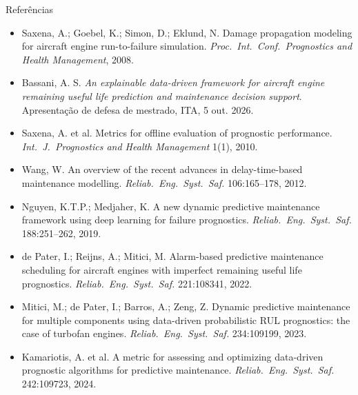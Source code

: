 \documentclass[aspectratio=169,10pt]{beamer}
\begin{document}
\begin{frame}{Referências}
  \scriptsize
  \begin{itemize}
    \item Saxena, A.; Goebel, K.; Simon, D.; Eklund, N. Damage propagation modeling for aircraft engine run-to-failure simulation. \emph{Proc.\ Int.\ Conf.\ Prognostics and Health Management}, 2008.
    \item Bassani, A. S. \emph{An explainable data-driven framework for aircraft engine remaining useful life prediction and maintenance decision support}. Apresentação de defesa de mestrado, ITA, 5 out. 2026.
    \item Saxena, A. et al. Metrics for offline evaluation of prognostic performance. \emph{Int.\ J.\ Prognostics and Health Management} 1(1), 2010.
    \item Wang, W. An overview of the recent advances in delay-time-based maintenance modelling. \emph{Reliab.\ Eng.\ Syst.\ Saf.} 106:165--178, 2012.
    \item Nguyen, K.T.P.; Medjaher, K. A new dynamic predictive maintenance framework using deep learning for failure prognostics. \emph{Reliab.\ Eng.\ Syst.\ Saf.} 188:251--262, 2019.
    \item de Pater, I.; Reijns, A.; Mitici, M. Alarm-based predictive maintenance scheduling for aircraft engines with imperfect remaining useful life prognostics. \emph{Reliab.\ Eng.\ Syst.\ Saf.} 221:108341, 2022.
    \item Mitici, M.; de Pater, I.; Barros, A.; Zeng, Z. Dynamic predictive maintenance for multiple components using data-driven probabilistic RUL prognostics: the case of turbofan engines. \emph{Reliab.\ Eng.\ Syst.\ Saf.} 234:109199, 2023.
    \item Kamariotis, A. et al. A metric for assessing and optimizing data-driven prognostic algorithms for predictive maintenance. \emph{Reliab.\ Eng.\ Syst.\ Saf.} 242:109723, 2024.
  \end{itemize}
\end{frame}
\end{document}
